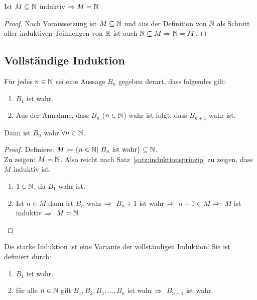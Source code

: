 \begin{satz}[Induktionsprinzip]
    \label{satz:induktionsprinzip}
    Ist $M\subseteq \mathbb{N}$ induktiv $\Rightarrow{} M = \mathbb{N}$
    \begin{proof}
        Nach Voraussetzung ist $M\subseteq \mathbb{N}$ und aus der Definition von $\mathbb{N}$ als Schnitt aller induktiven Teilmengen von $\mathbb{R}$ ist auch $\mathbb{N}\subseteq M \Rightarrow{} \mathbb{N} = M$.
    \end{proof}
\end{satz}


\subsection{Vollständige Induktion}

\begin{satz}[Induktionsbeweis]
    Für jedes $n\in\mathbb{N}$ sei eine Aussage $B_n$ gegeben derart, dass folgendes gilt:
    \begin{enumerate}
        \item $B_1$ ist wahr.
        \item Aus der Annahme, dass $B_n$ ($n\in\mathbb{N}$) wahr ist folgt, dass $B_{n+1}$ wahr ist.
    \end{enumerate}
    Dann ist $B_n$ wahr $\forall n\in\mathbb{N}$.
    \begin{proof}
        Definiere: $M\coloneqq\left\{n\in\mathbb{N}|~B_n\text{ ist wahr}\right\} \subseteq \mathbb{N}$.\\
        Zu zeigen: $M=\mathbb{N}$. Also reicht nach Satz~\ref{satz:induktionsprinzip} zu zeigen, dass $M$ induktiv ist.
        \begin{enumerate}
            \item $1\in\mathbb{N}$, da $B_1$ wahr ist.
            \item Ist $n\in M$ dann ist $B_n$ wahr $\Rightarrow{}$ $B_n+1$ ist wahr $\Rightarrow{}$ $n+1\in M$ $\Rightarrow{}$ $M$ ist induktiv $\Rightarrow{}$ $M=\mathbb{N}$ \qedhere
        \end{enumerate}
    \end{proof}
\end{satz}

\begin{bemerkung}
    Die starke Induktion ist eine Variante der vollständigen Induktion. Sie ist definiert durch:
    \begin{enumerate}
        \item $B_1$ ist wahr.
        \item für alle $n\in\mathbb{N}$ gilt $B_1, B_2, B_3, \dots, B_n$ ist wahr $\Rightarrow{}$ $B_{n+1}$ ist wahr.
    \end{enumerate}
\end{bemerkung}

